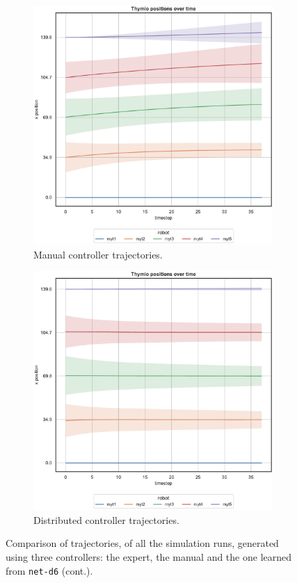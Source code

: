 \begin{figure}[!htb]\ContinuedFloat
	\begin{center}
	\begin{subfigure}[h]{0.49\textwidth}
		\centering			
		\includegraphics[width=.9\textwidth]{contents/images/net-d6/position-overtime-manual}%
		\caption{Manual controller trajectories.}
	\end{subfigure}
	\hfill
	\begin{subfigure}[h]{0.49\textwidth}
		\centering
		\includegraphics[width=.9\textwidth]{contents/images/net-d6/position-overtime-learned_distributed}
		\caption{Distributed controller trajectories.}
	\end{subfigure}
	\end{center}
	\caption[]{Comparison 
	of trajectories, of all the simulation runs, generated using three controllers: the 
	expert, the manual and the one learned from \texttt{net-d6} (cont.).}
	\label{fig:net-d6traj}
\end{figure}

